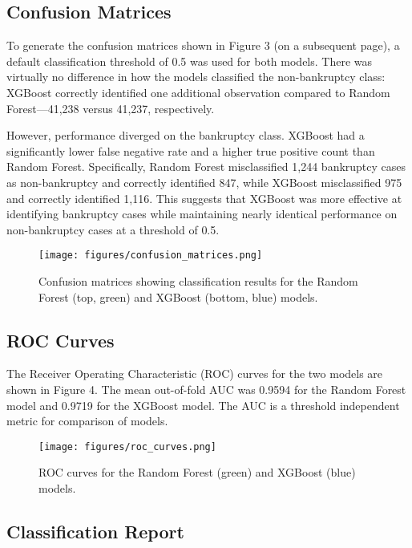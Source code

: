 \documentclass{article}      %
\begin{document}
\subsection{Confusion Matrices}

To generate the confusion matrices shown in Figure 3 (on a subsequent page), a default classification threshold of 0.5 was used for both models. There was virtually no difference in how the models classified the non-bankruptcy class: XGBoost correctly identified one additional observation compared to Random Forest---41,238 versus 41,237, respectively.

However, performance diverged on the bankruptcy class. XGBoost had a significantly lower false negative rate and a higher true positive count than Random Forest. Specifically, Random Forest misclassified 1,244 bankruptcy cases as non-bankruptcy and correctly identified 847, while XGBoost misclassified 975 and correctly identified 1,116. This suggests that XGBoost was more effective at identifying bankruptcy cases while maintaining nearly identical performance on non-bankruptcy cases at a threshold of 0.5.

\begin{figure}[ht]
	\centering
	\texttt{[image: figures/confusion\_matrices.png]}
	\caption{Confusion matrices showing classification results for the Random Forest (top, green) and XGBoost (bottom, blue) models.}
	\label{fig:confusion_matrices}
\end{figure}

\subsection{ROC Curves}

The Receiver Operating Characteristic (ROC) curves for the two models are shown in Figure 4. The mean out-of-fold AUC was 0.9594 for the Random Forest model and 0.9719 for the XGBoost model. The AUC is a threshold independent metric for comparison of models.

\begin{figure}[!h]
	\centering
	\texttt{[image: figures/roc\_curves.png]}
	\caption{ROC curves for the Random Forest (green) and XGBoost (blue) models.}
	\label{fig:roc_curves}
\end{figure}

\subsection{Classification Report}
\end{document}
